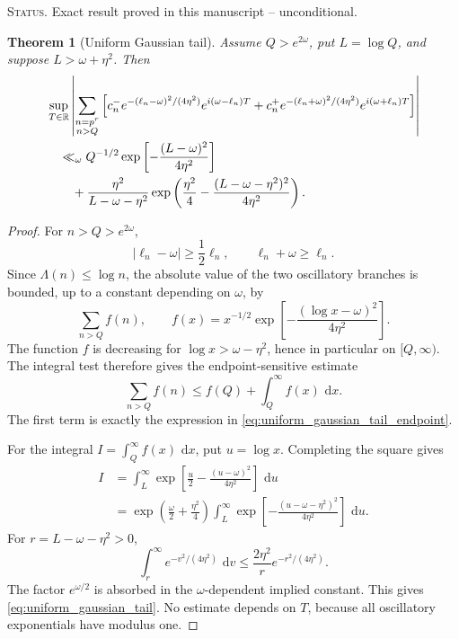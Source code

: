 \documentclass[11pt]{amsart}
\numberwithin{equation}{section}
\theoremstyle{plain}
\newtheorem{theorem}{Theorem}[section]
\theoremstyle{definition}
\theoremstyle{remark}
\newcommand{\1}{\mathbf{1}}
\newcommand{\dd}{\,\mathrm{d}}
\newcommand{\statusnote}[1]{%
  \par\smallskip\noindent
  \begingroup\footnotesize\textsc{Status.} #1\endgroup
  \par\smallskip}
\begin{document}
\statusnote{Exact result proved in this manuscript -- unconditional.}
\begin{theorem}[Uniform Gaussian tail]
\label{thm:uniform_gaussian_tail}
Assume \(Q>e^{2\omega}\), put \(L=\log Q\), and suppose
\(L>\omega+\eta^2\).  Then
\begin{align}
&\sup_{T\in\mathbb R}
\left|
\sum_{\substack{n=p^r\\n>Q}}
\left[
 c_n^-e^{-(\ell_n-\omega)^2/(4\eta^2)}e^{i(\omega-\ell_n)T}
+c_n^+e^{-(\ell_n+\omega)^2/(4\eta^2)}e^{i(\omega+\ell_n)T}
\right]
\right|
\notag
\\
&\quad\ll_\omega
Q^{-1/2}
\exp\left[-\frac{(L-\omega)^2}{4\eta^2}\right]
\label{eq:uniform_gaussian_tail_endpoint}
\\
&\qquad+
\frac{\eta^2}{L-\omega-\eta^2}
\exp\left(
\frac{\eta^2}{4}
-
\frac{(L-\omega-\eta^2)^2}{4\eta^2}
\right).
\label{eq:uniform_gaussian_tail}
\end{align}
\end{theorem}

\begin{proof}
For \(n>Q>e^{2\omega}\),
\begin{equation}
|\ell_n-\omega|\geq\frac12\ell_n,
\qquad
\ell_n+\omega\geq\ell_n.
\label{eq:tail_denominator_bounds_detailed}
\end{equation}
Since \(\Lambda(n)\leq\log n\), the absolute value of the two oscillatory
branches is bounded, up to a constant depending on \(\omega\), by
\begin{equation}
\sum_{n>Q}f(n),
\qquad
f(x)
=
x^{-1/2}
\exp\left[-\frac{(\log x-\omega)^2}{4\eta^2}\right].
\label{eq:tail_integer_sum_detailed}
\end{equation}
The function \(f\) is decreasing for
\(\log x>\omega-\eta^2\), hence in particular on \([Q,\infty)\).
The integral test therefore gives the endpoint-sensitive estimate
\begin{equation}
\sum_{n>Q}f(n)
\leq
f(Q)+\int_Q^\infty f(x)\,\dd x.
\label{eq:tail_sum_endpoint_integral}
\end{equation}
The first term is exactly the expression in
\eqref{eq:uniform_gaussian_tail_endpoint}.

For the integral \(I=\int_Q^\infty f(x)\,\dd x\), put \(u=\log x\).
Completing the square gives
\begin{align}
I
&=
\int_L^\infty
\exp\left[
\frac u2-
\frac{(u-\omega)^2}{4\eta^2}
\right]\,\dd u
\label{eq:tail_square_one}
\\
&=
\exp\left(\frac\omega2+\frac{\eta^2}{4}\right)
\int_L^\infty
\exp\left[-
\frac{(u-\omega-\eta^2)^2}{4\eta^2}
\right]\,\dd u.
\label{eq:tail_square_two}
\end{align}
For \(r=L-\omega-\eta^2>0\),
\begin{equation}
\int_r^\infty e^{-v^2/(4\eta^2)}\,\dd v
\leq
\frac{2\eta^2}{r}e^{-r^2/(4\eta^2)}.
\label{eq:gaussian_tail_elementary}
\end{equation}
The factor \(e^{\omega/2}\) is absorbed in the
\(\omega\)-dependent implied constant.  This gives
\eqref{eq:uniform_gaussian_tail}.  No estimate depends on \(T\), because
all oscillatory exponentials have modulus one.
\end{proof}
\end{document}
